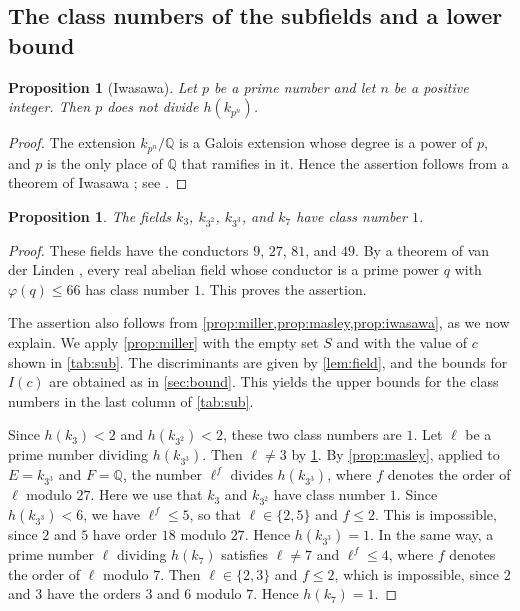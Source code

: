 \documentclass[11pt]{amsart}
\theoremstyle{plain}
\newtheorem{proposition}[theorem]{Proposition}
\theoremstyle{definition}
\begin{document}
\subsection{The class numbers of the subfields and a lower bound}

\begin{proposition}[Iwasawa] \label{prop:iwasawa}
Let $p$ be a prime number and let $n$ be a positive integer. Then $p$ does not divide $h(k_{p^n})$.
\end{proposition}

\begin{proof}
The extension $k_{p^n}/\mathbb{Q}$ is a Galois extension whose degree is a power of $p$, and $p$ is the only place of $\mathbb{Q}$ that ramifies in it.
Hence the assertion follows from a theorem of Iwasawa \cite{Iw56}; see \cite[Theorem 10.4]{Wa97}.
\end{proof}

\begin{proposition} \label{prop:sub}
The fields $k_3$, $k_{3^2}$, $k_{3^3}$, and $k_7$ have class number $1$.
\end{proposition}

\begin{proof}
These fields have the conductors $9$, $27$, $81$, and $49$.
By a theorem of van der Linden \cite[Theorem 1]{vdL82}, every real abelian field whose conductor is a prime power $q$ with $\varphi(q) \le 66$ has class number $1$.
This proves the assertion.

The assertion also follows from \cref{prop:miller,prop:masley,prop:iwasawa}, as we now explain.
We apply \cref{prop:miller} with the empty set $S$ and with the value of $c$ shown in \cref{tab:sub}.
The discriminants are given by \cref{lem:field}, and the bounds for $I(c)$ are obtained as in \cref{sec:bound}.
This yields the upper bounds for the class numbers in the last column of \cref{tab:sub}.

Since $h(k_3) < 2$ and $h(k_{3^2}) < 2$, these two class numbers are $1$.
Let $\ell$ be a prime number dividing $h(k_{3^3})$.
Then $\ell \ne 3$ by \cref{prop:iwasawa}.
By \cref{prop:masley}, applied to $E = k_{3^3}$ and $F = \mathbb{Q}$, the number $\ell^f$ divides $h(k_{3^3})$, where $f$ denotes the order of $\ell$ modulo $27$.
Here we use that $k_3$ and $k_{3^2}$ have class number $1$.
Since $h(k_{3^3}) < 6$, we have $\ell^f \le 5$, so that $\ell \in \{2, 5\}$ and $f \le 2$.
This is impossible, since $2$ and $5$ have order $18$ modulo $27$.
Hence $h(k_{3^3}) = 1$.
In the same way, a prime number $\ell$ dividing $h(k_7)$ satisfies $\ell \ne 7$ and $\ell^f \le 4$, where $f$ denotes the order of $\ell$ modulo $7$.
Then $\ell \in \{2, 3\}$ and $f \le 2$, which is impossible, since $2$ and $3$ have the orders $3$ and $6$ modulo $7$.
Hence $h(k_7) = 1$.
\end{proof}
\end{document}
